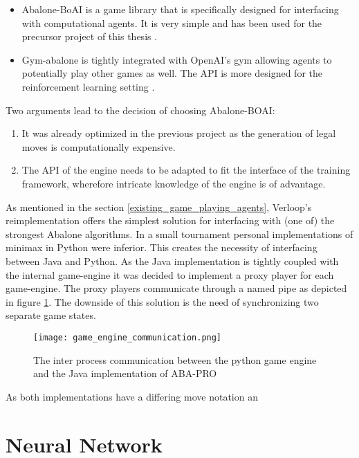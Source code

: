 \begin{itemize}
    \item Abalone-BoAI is a game library that is specifically designed for interfacing with computational agents. It is very simple and has been used for the precursor project of this thesis \cite{scriptim_scriptimabalone-boai_2021}.
    \item Gym-abalone is tightly integrated with OpenAI's gym allowing agents to potentially play other games as well. The API is more designed for the reinforcement learning setting \cite{towzeur_towzeurgym-abalone_2021}.
\end{itemize}

Two arguments lead to the decision of choosing Abalone-BOAI:
\begin{enumerate}
    \item It was already optimized in the previous project as the generation of legal moves is computationally expensive.
    \item The API of the engine needs to be adapted to fit the interface of the training framework, wherefore intricate knowledge of the engine is of advantage.
\end{enumerate}

As mentioned in the section \ref{existing_game_playing_agents}, Verloop's reimplementation \cite{verloop_abaloneai_nodate} offers the simplest solution for interfacing with (one of) the strongest Abalone algorithms. In a small tournament personal implementations of minimax in Python \cite{claussen_abalone_2021} were inferior. This creates the necessity of interfacing between Java and Python. As the Java implementation is tightly coupled with the internal game-engine it was decided to implement a proxy player for each game-engine. The proxy players communicate through a named pipe as depicted in figure \ref{python_java_ipc}. The downside of this solution is the need of synchronizing two separate game states.

\begin{figure}
    \centering
    \texttt{[image: game\_engine\_communication.png]}
    \caption{The inter process communication between the python game engine and the Java implementation of ABA-PRO}
    \label{python_java_ipc}
\end{figure}

As both implementations have a differing move notation an

\section{Neural Network}
